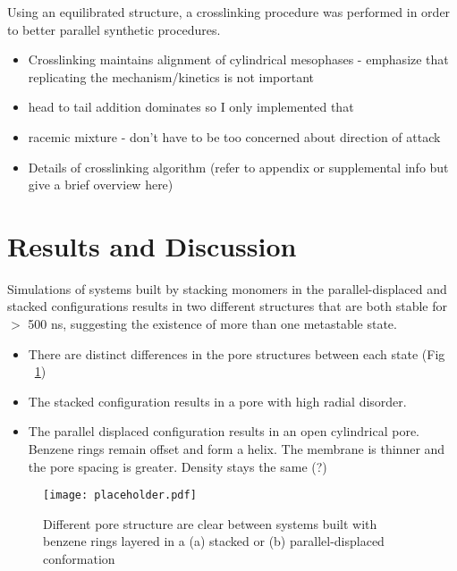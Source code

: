 \documentclass{article}
\begin{document}
\begin{itemize}
\begin{itemize}
	Using an equilibrated structure, a crosslinking procedure was performed in order to better parallel synthetic procedures. 
	\begin{itemize}
		\item Crosslinking maintains alignment of cylindrical mesophases - emphasize that replicating the mechanism/kinetics is not important 
		\item head to tail addition dominates so I only implemented that
		\item racemic mixture - don't have to be too concerned about direction of attack 
		\item Details of crosslinking algorithm (refer to appendix or supplemental info but give a brief overview here)
	\end{itemize}  
	
	\section{Results and Discussion}
	
	Simulations of systems built by stacking monomers in the parallel-displaced and stacked configurations results in two different structures that are both stable for $>$ 500 ns, suggesting the existence of more than one metastable state.
	\begin{itemize}
		\item There are distinct differences in the pore structures between each state (Fig ~\ref{fig:porestructures})
		\item The stacked configuration results in a pore with high radial disorder. 
		\item The parallel displaced configuration results in an open cylindrical pore. Benzene rings remain offset and form a helix. The membrane is thinner and the pore spacing is greater. Density stays the same (?)
	\end{itemize}

	\begin{figure}
	\centering
	\texttt{[image: placeholder.pdf]}
		\caption{Different pore structure are clear between systems built with benzene rings layered in a (a) stacked or (b) parallel-displaced conformation}
		\label{fig:porestructures}
	\end{figure}


\end{itemize}
\end{itemize}
\end{document}
